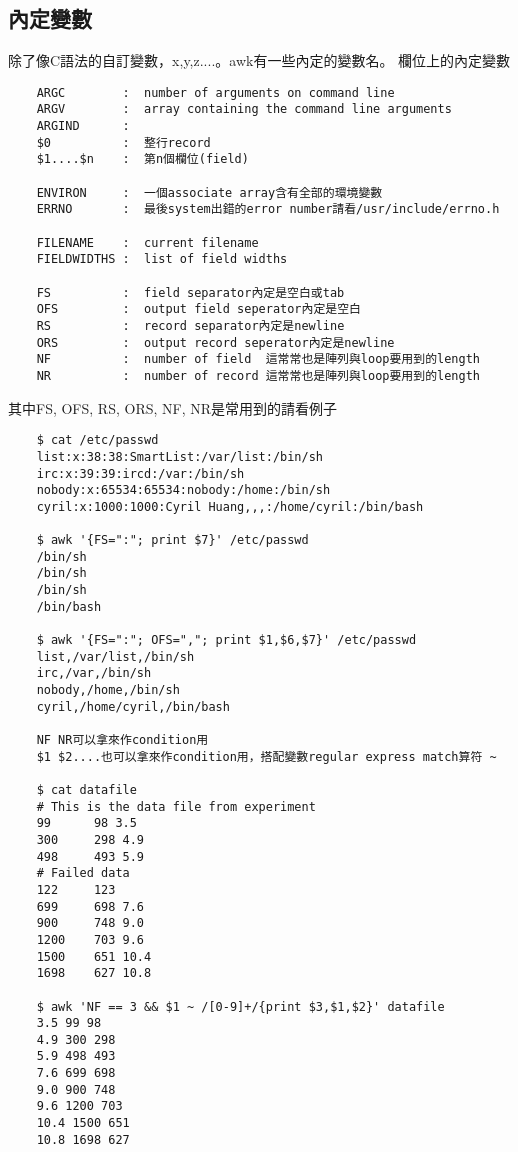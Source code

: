     \subsection{內定變數}
    除了像C語法的自訂變數，x,y,z....。awk有一些內定的變數名。
    欄位上的內定變數
    \begin{verbatim}
    ARGC        :  number of arguments on command line
    ARGV        :  array containing the command line arguments
    ARGIND      :  
    $0          :  整行record
    $1....$n    :  第n個欄位(field)
    
    ENVIRON     :  一個associate array含有全部的環境變數
    ERRNO       :  最後system出錯的error number請看/usr/include/errno.h
    
    FILENAME    :  current filename
    FIELDWIDTHS :  list of field widths
   
    FS          :  field separator內定是空白或tab
    OFS         :  output field seperator內定是空白
    RS          :  record separator內定是newline
    ORS         :  output record seperator內定是newline
    NF          :  number of field	這常常也是陣列與loop要用到的length
    NR          :  number of record	這常常也是陣列與loop要用到的length
    \end{verbatim}
    其中FS, OFS, RS, ORS, NF, NR是常用到的請看例子
    \begin{verbatim}
    $ cat /etc/passwd
    list:x:38:38:SmartList:/var/list:/bin/sh
    irc:x:39:39:ircd:/var:/bin/sh
    nobody:x:65534:65534:nobody:/home:/bin/sh
    cyril:x:1000:1000:Cyril Huang,,,:/home/cyril:/bin/bash

    $ awk '{FS=":"; print $7}' /etc/passwd
    /bin/sh
    /bin/sh
    /bin/sh
    /bin/bash

    $ awk '{FS=":"; OFS=","; print $1,$6,$7}' /etc/passwd
    list,/var/list,/bin/sh
    irc,/var,/bin/sh
    nobody,/home,/bin/sh
    cyril,/home/cyril,/bin/bash

    NF NR可以拿來作condition用
    $1 $2....也可以拿來作condition用，搭配變數regular express match算符 ~

    $ cat datafile
    # This is the data file from experiment
    99      98 3.5
    300     298 4.9
    498     493 5.9
    # Failed data
    122     123
    699     698 7.6
    900     748 9.0
    1200    703 9.6
    1500    651 10.4
    1698    627 10.8

    $ awk 'NF == 3 && $1 ~ /[0-9]+/{print $3,$1,$2}' datafile
    3.5 99 98
    4.9 300 298
    5.9 498 493
    7.6 699 698
    9.0 900 748
    9.6 1200 703
    10.4 1500 651
    10.8 1698 627
    \end{verbatim}

